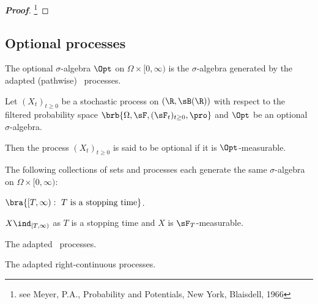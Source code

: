 \begin{proof}[\bf Proof]
\footnote{see Meyer, P.A., Probability and Potentials, New York, Blaisdell, 1966}
\end{proof}


\subsection{Optional processes}%

\begin{definition}\label{def:progressive_sigma_algebra}
The optional $\sigma$-algebra $\Opt$ on $\Omega \times [0,\infty)$ is the $\sigma$-algebra generated by the adapted (pathwise) \cadlag\ processes.%
\end{definition}


\begin{definition}
\label{def:optimal_stochastic_process}%
Let $(X_t)_{t\geq 0}$ be a stochastic process on $(\R,\sB(\R))$ with respect to the filtered probability space $\brb{\Omega,\sF,(\sF_t)_{t\geq 0},\pro}$ and $\Opt$ be an optional $\sigma$-algebra.

Then the process $(X_t)_{t\geq 0}$ is said to be optional if it is $\Opt$-measurable.
\end{definition}


\begin{theorem}
The following collections of sets and processes each generate the same $\sigma$-algebra on $\Omega\times [0,\infty)$:
\ben
\item [(i)] $\bra{[T,\infty):\ T \text{ is a stopping time}}$.
\item [(ii)] $X\ind_{[T,\infty)}$ as $T$ is a stopping time and $X$ is $\sF_T$-measurable.
\item [(iii)] The adapted \cadlag\  processes.
\item [(iv)] The adapted right-continuous processes.
\een
\end{theorem}


